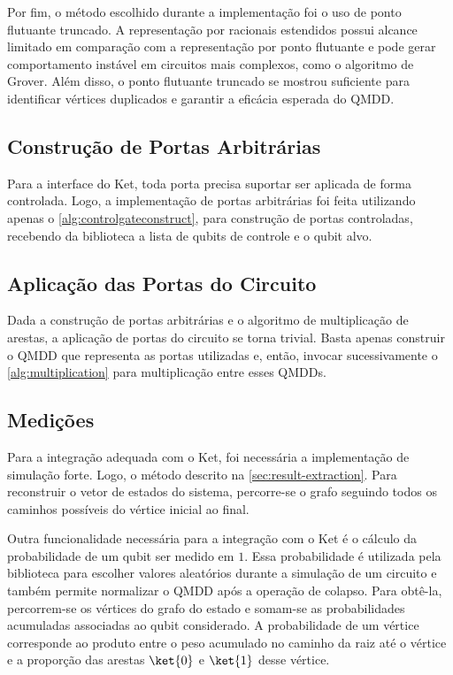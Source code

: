 Por fim, o método escolhido durante a implementação foi o uso de ponto flutuante truncado. A representação por racionais estendidos possui alcance limitado em comparação com a representação por ponto flutuante e pode gerar comportamento instável em circuitos mais complexos, como o algoritmo de Grover. Além disso, o ponto flutuante truncado se mostrou suficiente para identificar vértices duplicados e garantir a eficácia esperada do QMDD.

\subsection{Construção de Portas Arbitrárias}

Para a interface do Ket, toda porta precisa suportar ser aplicada de forma controlada. Logo, a implementação de portas arbitrárias foi feita utilizando apenas o \cref{alg:controlgateconstruct}, para construção de portas controladas, recebendo da biblioteca a lista de qubits de controle e o qubit alvo.

\subsection{Aplicação das Portas do Circuito}

Dada a construção de portas arbitrárias e o algoritmo de multiplicação de arestas, a aplicação de portas do circuito se torna trivial. Basta apenas construir o QMDD que representa as portas utilizadas e, então, invocar sucessivamente o \cref{alg:multiplication} para multiplicação entre esses QMDDs.

\subsection{Medições}

Para a integração adequada com o Ket, foi necessária a implementação de simulação forte. Logo, o método descrito na \cref{sec:result-extraction}. Para reconstruir o vetor de estados do sistema, percorre-se o grafo seguindo todos os caminhos possíveis do vértice inicial ao final.

Outra funcionalidade necessária para a integração com o Ket é o cálculo da probabilidade de um qubit ser medido em $1$. Essa probabilidade é utilizada pela biblioteca para escolher valores aleatórios durante a simulação de um circuito e também permite normalizar o QMDD após a operação de colapso. Para obtê-la, percorrem-se os vértices do grafo do estado e somam-se as probabilidades acumuladas associadas ao qubit considerado. A probabilidade de um vértice corresponde ao produto entre o peso acumulado no caminho da raiz até o vértice e a proporção das arestas $\ket{0}$ e $\ket{1}$ desse vértice.

